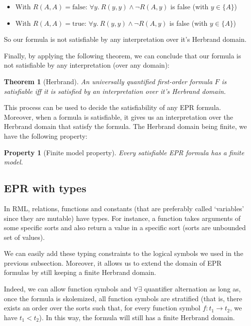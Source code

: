 \documentclass[11pt,a4paper,oldfontcommands,openany]{memoir}
\newtheorem*{theorem}{Theorem}
\newtheorem*{property}{Property}
\begin{document}
        \begin{itemize}
            \item With \(R(A,A)=\text{false}\): \(\forall y. \ R(y,y) \land \neg R(A,y)\) is false (with \( y \in \{A\} \))
            \item With \(R(A,A)=\text{true}\): \(\forall y. \ R(y,y) \land \neg R(A,y)\) is false (with \( y \in \{A\} \))
        \end{itemize}

        So our formula is not satisfiable by any interpretation over it's Herbrand domain.

        Finally, by applying the following theorem, we can conclude that our formula is not satisfiable by any interpretation (over any domain):
        \begin{theorem}[Herbrand]
            An universally quantified first-order formula \(F\) is satisfiable iff it is satisfied by an interpretation over it's Herbrand domain.
        \end{theorem}

        This process can be used to decide the satisfiability of any EPR formula. Moreover, when a formula is satisfiable,
        it gives us an interpretation over the Herbrand domain that satisfy the formula.
        The Herbrand domain being finite, we have the following property:

        \begin{property}[Finite model property]
            Every satisfiable EPR formula has a finite model.
        \end{property}

        \subsection{EPR with types}

        In RML, relations, functions and constants (that are preferably called `variables' since they are mutable) have types.
        For instance, a function takes arguments of some specific sorts and also return a value in a specific sort (sorts are unbounded set of values).

        We can easily add these typing constraints to the logical symbols we used in the previous subsection.
        Moreover, it allows us to extend the domain of EPR formulas by still keeping a finite Herbrand domain.

        Indeed, we can allow function symbols and \(\forall\exists\) quantifier alternation as long as,
        once the formula is skolemized, all function symbols are stratified (that is, there exists
        an order over the sorts such that, for every function symbol \( f: t_1 \to t_2 \), we have \( t_1 < t_2 \)).
        In this way, the formula will still has a finite Herbrand domain.
\end{document}
